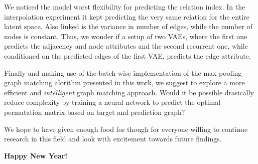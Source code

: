 We noticed the model worst flexibility for predicting the relation index. In the interpolation experiment it kept predicting the very same relation for the entire latent space. Also linked is the variance in number of edges, while the number of nodes is constant. Thus, we wonder if a setup of two VAEs, where the first one predicts the adjacency and node attributes and the second recurrent one, while conditioned on the predicted edges of the first VAE, predicts the edge attribute.

Finally and making use of the batch wise implementation of the max-pooling graph matching alorithm presented in this work, we suggest to explore a more efficient and \textit{intelligent} graph matching approach. Would it be possible drasically reduce complexity by training a neural network to predict the optimal permutation matrix based on target and prediction graph?




We hope to have given enough food for though for everyone willing to continue research in this field and look with excitement towards future findings.

\textbf{Happy New Year!}
